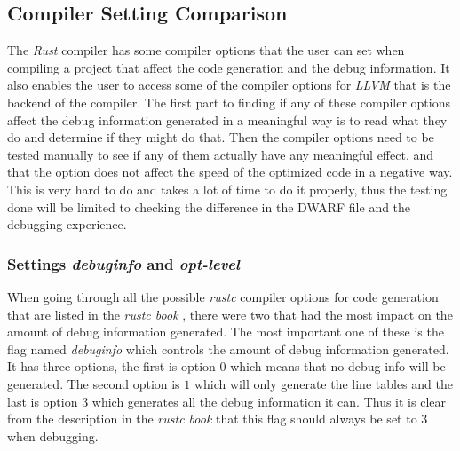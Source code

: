 \subsection{Compiler Setting Comparison}
\label{sec:settingscomparison}


The \emph{Rust} compiler has some compiler options that the user can set when compiling a project that affect the code generation and the debug information.
It also enables the user to access some of the compiler options for \emph{LLVM} that is the backend of the compiler.
The first part to finding if any of these compiler options affect the debug information generated in a meaningful way is to read what they do and determine if they might do that.
Then the compiler options need to be tested manually to see if any of them actually have any meaningful effect, and that the option does not affect the speed of the optimized code in a negative way.
This is very hard to do and takes a lot of time to do it properly, thus the testing done will be limited to checking the difference in the \gls{DWARF} file and the debugging experience.


\subsubsection{Settings \emph{debuginfo} and \emph{opt-level}}
When going through all the possible \emph{rustc} compiler options for code generation that are listed in the \emph{rustc book} \cite{rustc-book-codegen}, there were two that had the most impact on the amount of debug information generated.
The most important one of these is the flag named \emph{debuginfo} which controls the amount of debug information generated.
It has three options, the first is option $0$ which means that no debug info will be generated.
The second option is $1$ which will only generate the line tables and the last is option $3$ which generates all the debug information it can.
Thus it is clear from the description in the \emph{rustc book} that this flag should always be set to $3$ when debugging.


